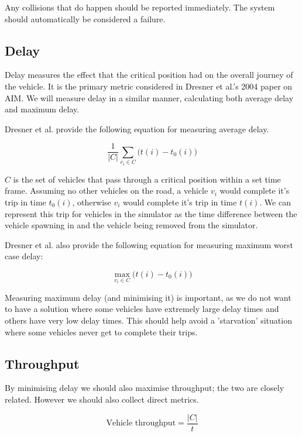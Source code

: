 Any collisions that do happen should be reported immediately. The system should automatically be considered a failure.

\subsection{Delay}
\label{subsec:Delay}
Delay measures the effect that the critical position had on the overall journey of the vehicle. It is the primary metric considered in Dresner et al.'s 2004 paper \citep{Dresner2004} on AIM. We will measure delay in a similar manner, calculating both average delay and maximum delay.

Dresner et al. provide the following equation for measuring average delay.

\begin{equation}
\frac{1}{|C|}\sum_{v_i\in{C}}\bigl(t(i) - t_0(i)\bigr)
\end{equation}

$C$ is the set of vehicles that pass through a critical position within a set time frame. Assuming no other vehicles on the road, a vehicle $v_i$ would complete it's trip in time $t_0(i)$, otherwise $v_i$ would complete it's trip in time $t(i)$. We can represent this trip for vehicles in the simulator as the time difference between the vehicle spawning in and the vehicle being removed from the simulator.

Dresner et al. also provide the following equation for measuring maximum worst case delay:

\begin{equation}
\max_{v_i\in{C}}\bigl({t(i)} - t_0(i)\bigr)
\end{equation}

Measuring maximum delay (and minimising it) is important, as we do not want to have a solution where some vehicles have extremely large delay times and others have very low delay times. This should help avoid a 'starvation' situation where some vehicles never get to complete their trips.

\subsection{Throughput}
\label{subsec:Throughput}
By minimising delay we should also maximise throughput; the two are closely related. However we should also collect direct metrics.

\begin{equation}
\text{Vehicle throughput} = \frac{|C|}{t}
\end{equation}

